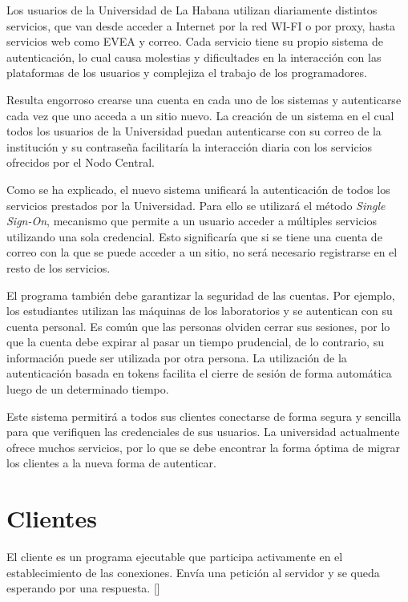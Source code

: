Los usuarios de la Universidad de La Habana  utilizan diariamente distintos servicios, que van desde acceder a Internet por la red WI-FI o por proxy, hasta servicios web como EVEA y correo. Cada servicio tiene su propio sistema de autenticación, lo cual causa molestias y dificultades en la interacción con las plataformas de los usuarios y complejiza el trabajo de los programadores.

Resulta engorroso crearse una cuenta en cada uno de los sistemas y autenticarse cada vez que uno acceda a un sitio nuevo. La creación de un sistema en el cual todos los usuarios de la Universidad puedan autenticarse con su correo de la institución y su contraseña facilitaría la interacción diaria con los servicios ofrecidos por el Nodo Central.


Como se ha explicado, el nuevo sistema unificará la autenticación de todos los servicios prestados por la Universidad. Para ello se utilizará el método \textit{Single Sign-On}, mecanismo que permite a un usuario acceder a múltiples servicios utilizando una sola credencial. Esto significaría que si se tiene una cuenta de correo con la que se puede acceder a un sitio, no será necesario registrarse en el resto de los servicios.

El programa también debe garantizar la seguridad de las cuentas. Por ejemplo, los estudiantes utilizan las máquinas de los laboratorios y se autentican con su cuenta personal. Es común que las personas olviden cerrar sus sesiones, por lo que la cuenta debe expirar al pasar un tiempo prudencial, de lo contrario, su información puede ser utilizada por otra persona. La utilización de la autenticación basada en tokens facilita el cierre de sesión de forma automática luego de un determinado tiempo.

Este sistema permitirá a todos sus clientes conectarse de forma segura y sencilla para que verifiquen las credenciales de sus usuarios. La universidad actualmente ofrece muchos servicios, por lo que se debe encontrar la forma óptima de migrar los clientes a la nueva forma de autenticar.


\section*{Clientes}
El cliente es un programa ejecutable que participa activamente en el establecimiento de las conexiones. Envía una petición al servidor y se queda esperando por una respuesta. [\cite{lizama2016redes}]

